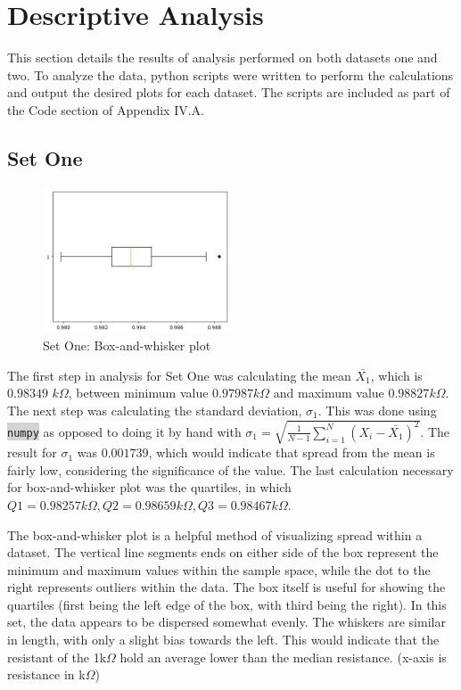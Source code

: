 \documentclass[10pt]{report}
\newcommand{\inlinecode}[2]{\colorbox{lightgray}{\lstinline[language=#1]$#2$}}
\begin{document}
\newpage

\section*{Descriptive Analysis}

This section details the results of analysis performed on both datasets one and two.
To analyze the data, python scripts were written to perform the calculations and output the desired
plots for each dataset. The scripts are included as part of the Code section of Appendix IV.A.

\subsection*{Set One}

\begin{figure}
    \centering
    \includegraphics[width=0.50\textwidth]{results/resistor_boxplot}
    \caption{Set One: Box-and-whisker plot}
\end{figure}

The first step in analysis for Set One was calculating the mean $\bar{X_1}$, which is  $0.98349$ $k\Omega$,
between minimum value $0.97987 k\Omega$ and maximum value $0.98827 k\Omega$. The next step was calculating
the standard deviation, $\sigma_1$. This was done using \inlinecode{Python}{numpy} as opposed
to doing it by hand with $\sigma_1 = \sqrt{\frac{1}{N-1} \sum_{i=1}^N (X_i - \bar{X_1})^2}$.
The result for $\sigma_1$ was $0.001739$, which would indicate that spread from the mean is fairly low,
considering the significance of the value.
The last calculation necessary for box-and-whisker plot was the quartiles,
in which $Q1 = 0.98257 k\Omega, Q2 = 0.98659 k\Omega, Q3 = 0.98467 k\Omega$.


The box-and-whisker plot is a helpful method of visualizing spread within a dataset.
The vertical line segments ends on either side of the box represent the minimum and maximum
values within the sample space, while the dot to the right represents outliers within the data.
The box itself is useful for showing the quartiles (first being the left edge of the box, with
third being the right).
In this set, the data appears to be dispersed somewhat evenly. The whiskers are similar in length,
with only a slight bias towards the left. This would indicate that the resistant of the 1k$\Omega$
hold an average lower than the median resistance. (x-axis is resistance in k$\Omega$)
\end{document}
